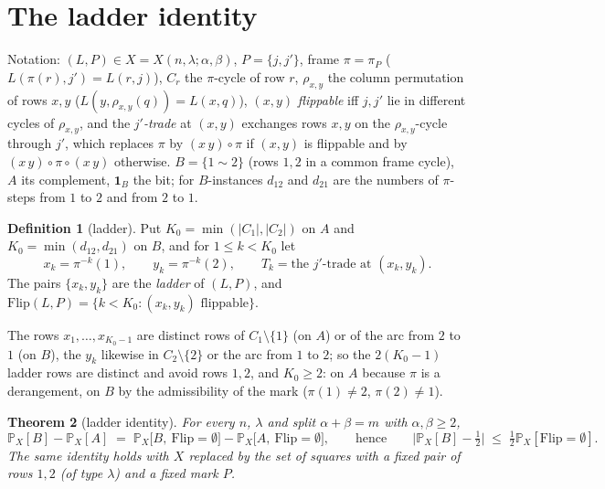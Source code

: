 \documentclass[11pt]{article}
\newtheorem{theorem}{Theorem}[section]
\theoremstyle{definition}
\newtheorem{definition}[theorem]{Definition}
\renewcommand{\Pr}{\mathbb{P}}
\begin{document}
\section{The ladder identity}\label{sec:ladder}

Notation:
$(L,P)\in X=X(n,\lambda;\alpha,\beta)$, $P=\{j,j'\}$, frame
$\pi=\pi_P$ ($L(\pi(r),j')=L(r,j)$), $C_r$ the $\pi$-cycle of row $r$,
$\rho_{x,y}$ the column permutation of rows $x,y$
($L(y,\rho_{x,y}(q))=L(x,q)$), $(x,y)$ \emph{flippable} iff $j,j'$ lie
in different cycles of $\rho_{x,y}$, and the \emph{$j'$-trade} at
$(x,y)$ exchanges rows $x,y$ on the $\rho_{x,y}$-cycle through $j'$,
which replaces $\pi$ by $(x\,y)\circ\pi$ if $(x,y)$ is flippable and by
$(x\,y)\circ\pi\circ(x\,y)$ otherwise.  $B=\{1\sim2\}$ (rows $1,2$ in a
common frame cycle), $A$ its complement, $\mathbf 1_B$ the bit; for $B$-instances $d_{12}$ and
$d_{21}$ are the numbers of $\pi$-steps from $1$ to $2$ and from $2$ to
$1$.

\begin{definition}[ladder]\label{def:ladder}
Put $K_0=\min(|C_1|,|C_2|)$ on $A$ and $K_0=\min(d_{12},d_{21})$ on
$B$, and for $1\le k<K_0$ let
\[
x_k=\pi^{-k}(1),\qquad y_k=\pi^{-k}(2),\qquad
T_k=\text{the $j'$-trade at }(x_k,y_k).
\]
The pairs $\{x_k,y_k\}$ are the \emph{ladder} of $(L,P)$, and
$\mathrm{Flip}(L,P)=\{k<K_0:(x_k,y_k)\text{ flippable}\}$.
\end{definition}

The rows $x_1,\dots,x_{K_0-1}$ are distinct rows of $C_1\setminus\{1\}$
(on $A$) or of the arc from $2$ to $1$ (on $B$), the $y_k$ likewise in
$C_2\setminus\{2\}$ or the arc from $1$ to $2$; so the $2(K_0-1)$
ladder rows are distinct and avoid rows $1,2$, and $K_0\ge2$: on $A$
because $\pi$ is a derangement, on $B$ by the admissibility of the mark
($\pi(1)\ne2$, $\pi(2)\ne1$).

\begin{theorem}[ladder identity]\label{thm:ladder}
For every $n$, $\lambda$ and split $\alpha+\beta=m$ with
$\alpha,\beta\ge2$,
\[
\Pr_X[B]-\Pr_X[A]\;=\;\Pr_X\bigl[B,\ \mathrm{Flip}=\emptyset\bigr]
-\Pr_X\bigl[A,\ \mathrm{Flip}=\emptyset\bigr],
\qquad\text{hence}\qquad
\bigl|\Pr_X[B]-\tfrac12\bigr|\;\le\;\tfrac12\Pr_X[\mathrm{Flip}=\emptyset].
\]
The same identity holds with $X$ replaced by the set of squares with a fixed pair of
rows $1,2$ (of type $\lambda$) and a fixed mark $P$.
\end{theorem}
\end{document}
